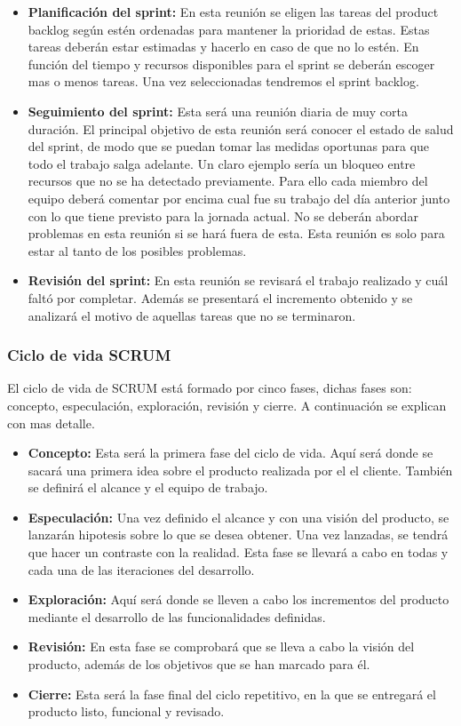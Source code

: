 \begin{itemize}
  \item \textbf{Planificación del sprint:} En esta reunión se eligen las tareas del product
     backlog según estén ordenadas para mantener la prioridad de estas. Estas tareas deberán
     estar estimadas y hacerlo en caso de que no lo estén. En función del tiempo y recursos
     disponibles para el sprint se deberán escoger mas o menos tareas. Una vez seleccionadas
     tendremos el sprint backlog.
  \item \textbf{Seguimiento del sprint:} Esta será una reunión diaria de muy corta duración.
     El principal objetivo de esta reunión será conocer el estado de salud del sprint, de modo
     que se puedan tomar las medidas oportunas para que todo el trabajo salga adelante. Un
     claro ejemplo sería un bloqueo entre recursos que no se ha detectado previamente. Para
     ello cada miembro del equipo deberá comentar por encima cual fue su trabajo del día
     anterior junto con lo que tiene previsto para la jornada actual. No se deberán abordar
     problemas en esta reunión si se hará fuera de esta. Esta reunión es solo para estar al
     tanto de los posibles problemas.
  \item \textbf{Revisión del sprint:} En esta reunión se revisará el trabajo realizado y cuál
     faltó por completar. Además se presentará el incremento obtenido y se analizará el motivo
     de aquellas tareas que no se terminaron.
\end{itemize}


\subsubsection{Ciclo de vida SCRUM}

El ciclo de vida de SCRUM está formado por cinco fases, dichas fases son: concepto, especulación,
 exploración, revisión y cierre. A continuación se explican con mas detalle.

\begin{itemize}
  \item \textbf{Concepto:} Esta será la primera fase del ciclo de vida. Aquí será donde se sacará
     una primera idea sobre el producto realizada por el el cliente. También se definirá el alcance
     y el equipo de trabajo.
  \item \textbf{Especulación:} Una vez definido el alcance y con una visión del producto, se lanzarán
     hipotesis sobre lo que se desea obtener. Una vez lanzadas, se tendrá que hacer un contraste
     con la realidad. Esta fase se llevará a cabo en todas y cada una de las iteraciones del desarrollo.
  \item \textbf{Exploración:} Aquí será donde se lleven a cabo los incrementos del producto mediante
     el desarrollo de las funcionalidades definidas.
  \item \textbf{Revisión:} En esta fase se comprobará que se lleva a cabo la visión del producto, además
     de los objetivos que se han marcado para él.
  \item \textbf{Cierre:} Esta será la fase final del ciclo repetitivo, en la que se entregará
     el producto listo, funcional y revisado.
\end{itemize}


